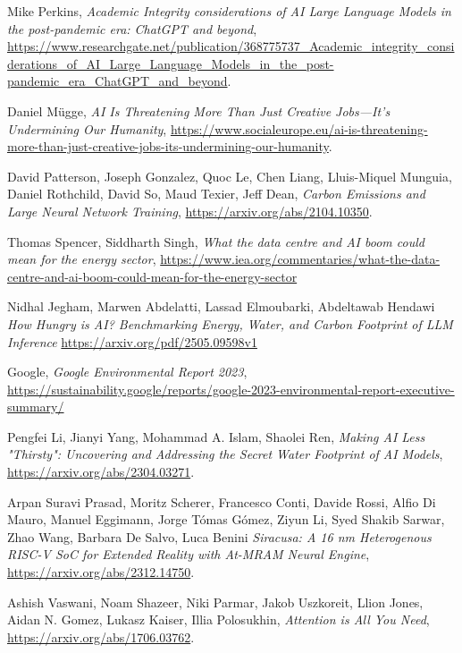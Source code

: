 \begin{thebibliography}{9}

	Mike Perkins,
	\textit{Academic Integrity considerations of AI Large Language Models in the post-pandemic era: ChatGPT and beyond},
	\url{https://www.researchgate.net/publication/368775737_Academic_integrity_considerations_of_AI_Large_Language_Models_in_the_post-pandemic_era_ChatGPT_and_beyond}.

	Daniel Mügge,
	\textit{AI Is Threatening More Than Just Creative Jobs—It’s Undermining Our Humanity},
	\url{https://www.socialeurope.eu/ai-is-threatening-more-than-just-creative-jobs-its-undermining-our-humanity}.

	David Patterson, Joseph Gonzalez, Quoc Le, Chen Liang, Lluis-Miquel Munguia, Daniel Rothchild, David So, Maud Texier, Jeff Dean,
	\textit{Carbon Emissions and Large Neural Network Training},
	\url{https://arxiv.org/abs/2104.10350}.

	Thomas Spencer, Siddharth Singh,
	\textit{What the data centre and AI boom could mean for the energy sector},
	\url{https://www.iea.org/commentaries/what-the-data-centre-and-ai-boom-could-mean-for-the-energy-sector}

	Nidhal Jegham, Marwen Abdelatti, Lassad Elmoubarki, Abdeltawab Hendawi
	\textit{How Hungry is AI? Benchmarking Energy, Water, and Carbon Footprint of LLM Inference}
	\url{https://arxiv.org/pdf/2505.09598v1}

	Google,
	\textit{Google Environmental Report 2023},
	\url{https://sustainability.google/reports/google-2023-environmental-report-executive-summary/}

	Pengfei Li, Jianyi Yang, Mohammad A. Islam, Shaolei Ren,
	\textit{Making AI Less "Thirsty": Uncovering and Addressing the Secret Water Footprint of AI Models},
	\url{https://arxiv.org/abs/2304.03271}.

	Arpan Suravi Prasad, Moritz Scherer, Francesco Conti, Davide Rossi, Alfio Di Mauro, Manuel Eggimann, Jorge Tómas Gómez, Ziyun Li, Syed Shakib Sarwar, Zhao Wang, Barbara De Salvo, Luca Benini
	\textit{Siracusa: A 16 nm Heterogenous RISC-V SoC for Extended Reality with At-MRAM Neural Engine},
	\url{https://arxiv.org/abs/2312.14750}.

	Ashish Vaswani, Noam Shazeer, Niki Parmar, Jakob Uszkoreit, Llion Jones, Aidan N. Gomez, Lukasz Kaiser, Illia Polosukhin,
	\textit{Attention is All You Need},
	\url{https://arxiv.org/abs/1706.03762}.


\end{thebibliography}
